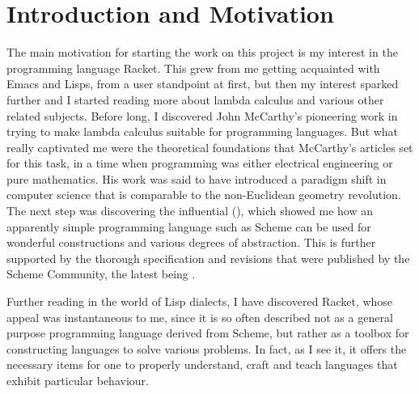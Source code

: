 
\chapter*{Introduction and Motivation}

The main motivation for starting the work on this project is my interest
in the programming language Racket. This grew from me getting acquainted
with Emacs and Lisps, from a user standpoint at first, but then my interest
sparked further and I started reading more about lambda calculus and various other
related subjects. Before long, I discovered John McCarthy's pioneering
work in trying to make lambda calculus suitable for programming languages.
But what really captivated me were the theoretical foundations that
McCarthy's articles \cite{mccarthy60, mccarthy61, mccarthy62} set for this
task, in a time when programming was either electrical engineering or
pure mathematics. His work was said to have introduced a paradigm shift
in computer science that is comparable to the non-Euclidean geometry
revolution. The next step was discovering the influential 
(\cite{sicp}), which showed me how an apparently simple programming
language such as Scheme can be used for wonderful constructions and
various degrees of abstraction. This is further supported by the
thorough specification and revisions that were published by the
Scheme Community, the latest being \cite{r7rs}.

Further reading in the world of Lisp dialects, I have discovered Racket,
whose appeal was instantaneous to me, since it is so often described not
as a general purpose programming language derived from Scheme\footnotemark,
but rather as a toolbox for constructing languages to solve various
problems. In fact, as I see it, it offers the necessary items for one to
properly understand, craft and teach languages that exhibit particular
behaviour.



